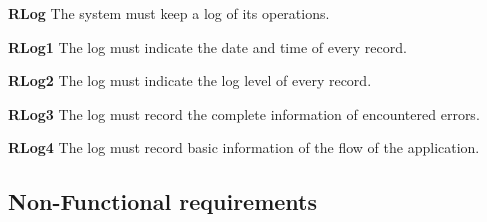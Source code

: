 \begin{description}
    \item \textbf{RLog} The system must keep a log of its operations.
        \begin{description}
            \item \textbf{RLog1} The log must indicate the date and time of every record.
            \item \textbf{RLog2} The log must indicate the log level of every record.
            \item \textbf{RLog3} The log must record the complete information of encountered errors.
            \item \textbf{RLog4} The log must record basic information of the flow of the application.
        \end{description}

\end{description}


\subsection{Non-Functional requirements}

